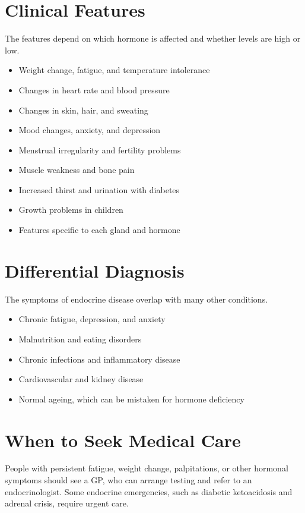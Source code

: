 \section*{Clinical Features}
The features depend on which hormone is affected and whether levels are high or low.
\begin{itemize}
    \item Weight change, fatigue, and temperature intolerance
    \item Changes in heart rate and blood pressure
    \item Changes in skin, hair, and sweating
    \item Mood changes, anxiety, and depression
    \item Menstrual irregularity and fertility problems
    \item Muscle weakness and bone pain
    \item Increased thirst and urination with diabetes
    \item Growth problems in children
    \item Features specific to each gland and hormone
\end{itemize}

\section*{Differential Diagnosis}
The symptoms of endocrine disease overlap with many other conditions.
\begin{itemize}
    \item Chronic fatigue, depression, and anxiety
    \item Malnutrition and eating disorders
    \item Chronic infections and inflammatory disease
    \item Cardiovascular and kidney disease
    \item Normal ageing, which can be mistaken for hormone deficiency
\end{itemize}

\section*{When to Seek Medical Care}
People with persistent fatigue, weight change, palpitations, or other hormonal symptoms should see a GP, who can arrange testing and refer to an endocrinologist. Some endocrine emergencies, such as diabetic ketoacidosis and adrenal crisis, require urgent care.

